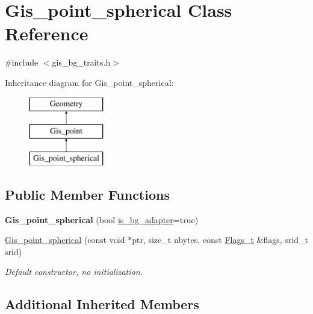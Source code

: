 \hypertarget{classGis__point__spherical}{}\section{Gis\+\_\+point\+\_\+spherical Class Reference}
\label{classGis__point__spherical}


{\ttfamily \#include $<$gis\+\_\+bg\+\_\+traits.\+h$>$}

Inheritance diagram for Gis\+\_\+point\+\_\+spherical\+:\begin{figure}[H]
\begin{center}
\leavevmode
\includegraphics[height=3.000000cm]{classGis__point__spherical}
\end{center}
\end{figure}
\subsection*{Public Member Functions}
\begin{DoxyCompactItemize}
\item 
\mbox{\label{classGis__point__spherical_a8b5522aaa2aef346af51aeb95f485553}} 
{\bfseries Gis\+\_\+point\+\_\+spherical} (bool \mbox{\hyperlink{classGeometry_ada614004627a9e7af129e51a34242af9}{is\+\_\+bg\+\_\+adapter}}=true)
\item 
\mbox{\label{classGis__point__spherical_a7d8afbd5030a7639ba988f0e24def366}} 
\mbox{\hyperlink{classGis__point__spherical_a7d8afbd5030a7639ba988f0e24def366}{Gis\+\_\+point\+\_\+spherical}} (const void $\ast$ptr, size\+\_\+t nbytes, const \mbox{\hyperlink{classGeometry_1_1Flags__t}{Flags\+\_\+t}} \&flags, srid\+\_\+t srid)
\begin{DoxyCompactList}\small\item\em Default constructor, no initialization. \end{DoxyCompactList}\end{DoxyCompactItemize}
\subsection*{Additional Inherited Members}


